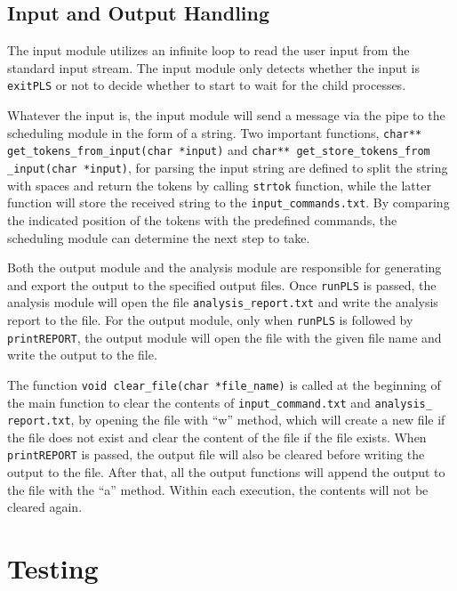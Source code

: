 \documentclass[a4paper, 12pt]{article}
\begin{document}
\subsection{Input and Output Handling}

The input module utilizes an infinite loop to read the user input from the standard input stream. The input module
only detects whether the input is \texttt{exitPLS} or not to decide whether to start to wait for the child processes. 

Whatever the input is, the input module will send a message via the pipe to the scheduling module in the form of a string.
Two important functions, \texttt{char** get\_tokens\_from\_input(char *input)} and 
\texttt{char** get\_store\_tokens\_from\\ \_input(char *input)},
for parsing the input string are defined to split the string with spaces and return the tokens by calling \texttt{strtok} function, while the latter function will store the received string to the \texttt{input\_commands.txt}.
By comparing the indicated position of the tokens with the predefined commands, the scheduling module can determine the next step to take.

Both the output module and the analysis module are responsible for generating and export the output to the specified output files. 
Once \texttt{runPLS} is passed, the analysis module will open the file \texttt{analysis\_report.txt} and write the analysis report to the file.
For the output module, only when \texttt{runPLS} is followed by \texttt{printREPORT}, the output module will open the file with 
the given file name and write the output to the file.

The function \texttt{void clear\_file(char *file\_name)} is called at the beginning of the main function to clear the contents of \texttt{input\_command.txt} and \texttt{analysis\_\\report.txt}, by opening the file with ``w'' method, which 
will create a new file if the file does not exist and clear the content of the file if the file exists. When \texttt{printREPORT} is passed, the output file will also be cleared before writing the output to the file.
After that, all the output functions will append the output to the file with the ``a'' method. Within each execution, the contents will not be cleared again.

\section{Testing}
\end{document}
